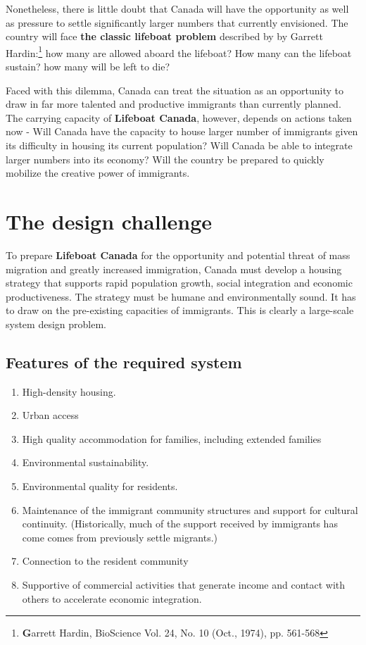 Nonetheless, there is little doubt that Canada will have the opportunity as well as pressure to settle significantly larger numbers that currently envisioned. 
The country will face \textbf{the classic lifeboat problem}  described by by Garrett Hardin:\footnote{\textbf Garrett Hardin, BioScience Vol. 24, No. 10 (Oct., 1974), pp. 561-568 } how many are allowed aboard the lifeboat?  How many can the lifeboat sustain? how many will be left to die?

Faced with this dilemma, Canada can treat the situation as an opportunity to draw in far more talented and productive immigrants  than currently planned. 
The carrying capacity of \textbf{Lifeboat Canada}, however, depends on actions taken now - Will Canada have the capacity to house larger number of  immigrants given its difficulty in housing its current population?  Will Canada be able to integrate larger numbers into its economy? Will the country be prepared to quickly mobilize  the creative power of immigrants.

\section{The design challenge}
To prepare \textbf{Lifeboat Canada} for the opportunity and 
potential threat of mass migration and greatly increased immigration, Canada must develop a housing strategy that supports rapid population growth, social integration and economic productiveness. The strategy must be humane and environmentally sound. It has to draw on the pre-existing capacities of immigrants. This is clearly a large-scale system design problem.

\subsection{Features of the required system}

\begin{enumerate}
    \item High-density housing.
    \item Urban access
    \item High quality accommodation for families, including extended families  
    \item Environmental sustainability.
    \item Environmental quality for residents.
    \item Maintenance of the immigrant community structures and support for cultural continuity. 
    (Historically, much of the support received by immigrants has come comes from previously settle migrants.) 
    \item Connection to the resident community
    \item Supportive of commercial activities that generate income 
    and contact with others to accelerate economic integration.
\end{enumerate}



